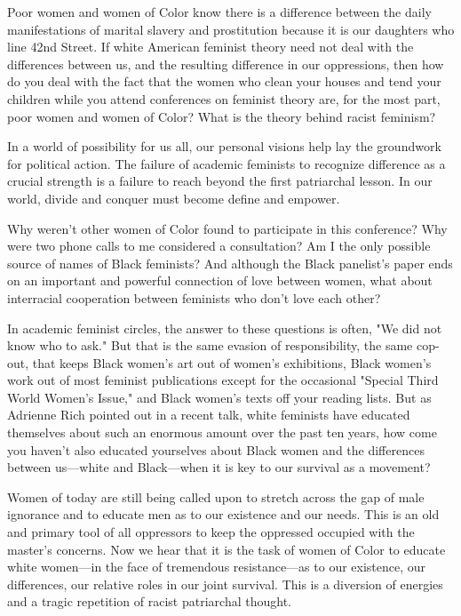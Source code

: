 \documentclass{article}
\begin{document}
Poor women and women of Color know there is a difference between the daily manifestations of marital slavery and prostitution because it is our daughters who line 42nd Street. If white American feminist theory need not deal with the differences between us, and the resulting difference in our oppressions, then how do you deal with the fact that the women who clean your houses and tend your children while you attend conferences on feminist theory are, for the most part, poor women and women of Color? What is the theory behind racist feminism? 

In a world of possibility for us all, our personal visions help lay the groundwork for political action. The failure of academic feminists to recognize difference as a crucial strength is a failure to reach beyond the first patriarchal lesson. In our world, divide and conquer must become define and empower. 

Why weren't other women of Color found to participate in this conference? Why were two phone calls to me considered a consultation? Am I the only possible source of names of Black feminists? And although the Black panelist's paper ends on an important and powerful connection of love between women, what about interracial cooperation between feminists who don't love each other? 

In academic feminist circles, the answer to these questions is often, "We did not know who to ask." But that is the same evasion of responsibility, the same cop-out, that keeps Black women's art out of women's exhibitions, Black women's work out of most feminist publications except for the occasional "Special Third World Women's Issue," and Black women's texts off your reading lists. But as Adrienne Rich pointed out in a recent talk, white feminists have educated themselves about such an enormous amount over the past ten years, how come you haven't also educated yourselves about Black women and the differences between us—white and Black—when it is key to our survival as a movement? 

Women of today are still being called upon to stretch across the gap of male ignorance and to educate men as to our existence and our needs. This is an old and primary tool of all oppressors to keep the oppressed occupied with the master's concerns. Now we hear that it is the task of women of Color to educate white women—in the face of tremendous resistance—as to our existence, our differences, our relative roles in our joint survival. This is a diversion of energies and a tragic repetition of racist patriarchal thought. 
\end{document}
